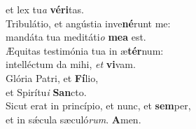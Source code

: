 \evenverse et lex tu\textit{a} \textbf{vé}\textbf{ri}tas.\\
\oddverse Tribulátio, et angústia inve\textbf{né}runt me:~\*\\
\oddverse mandáta tua meditáti\textit{o} \textbf{me}\textbf{a} est.\\
\evenverse Æquitas testimónia tua in æ\textbf{tér}num:~\*\\
\evenverse intelléctum da mihi, \textit{et} \textbf{vi}vam.\\
\oddverse Glória Patri, et \textbf{Fí}lio,~\*\\
\oddverse et Spirítu\textit{i} \textbf{San}cto.\\
\evenverse Sicut erat in princípio, et nunc, et \textbf{sem}per,~\*\\
\evenverse et in sǽcula sæculó\textit{rum}. \textbf{A}men.\\
